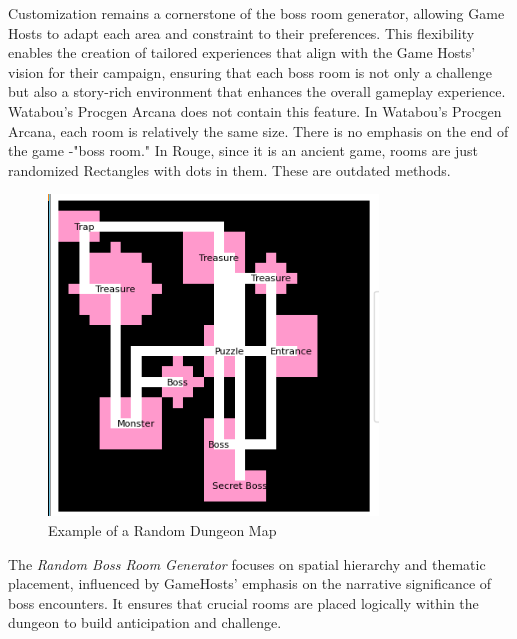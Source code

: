 \documentclass[10pt,twocolumn]{article}
\begin{document}
Customization remains a cornerstone of the boss room generator, allowing Game Hosts to adapt each area and constraint to their preferences. This flexibility enables the creation of tailored experiences that align with the Game Hosts' vision for their campaign, ensuring that each boss room is not only a challenge but also a story-rich environment that enhances the overall gameplay experience. Watabou's Procgen Arcana does not contain this feature. In Watabou's Procgen Arcana, each room is relatively the same size. There is no emphasis on the  end of the game -"boss room." In Rouge, since it is an ancient game, rooms are just randomized Rectangles with dots in them. These are outdated methods.

\begin{figure}[h]
\centering
\includegraphics[width=0.5\linewidth]{mymap.png}
\caption{Example of a Random Dungeon Map}
\label{fig:dungeon-map}
\end{figure}

The \textit{Random Boss Room Generator} focuses on spatial hierarchy and thematic placement, influenced by GameHosts' emphasis on the narrative significance of boss encounters. It ensures that crucial rooms are placed logically within the dungeon to build anticipation and challenge.
\end{document}
